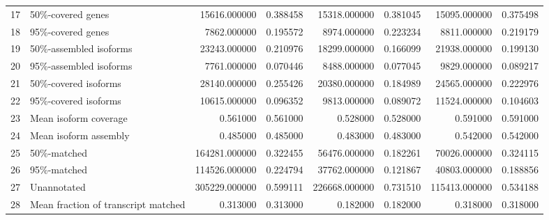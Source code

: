 \begin{tabular}{llrrrrrr}
17 & 50\%-covered genes & 15616.000000 & 0.388458 & 15318.000000 & 0.381045 & 15095.000000 & 0.375498 \\
18 & 95\%-covered genes & 7862.000000 & 0.195572 & 8974.000000 & 0.223234 & 8811.000000 & 0.219179 \\
19 & 50\%-assembled isoforms & 23243.000000 & 0.210976 & 18299.000000 & 0.166099 & 21938.000000 & 0.199130 \\
20 & 95\%-assembled isoforms & 7761.000000 & 0.070446 & 8488.000000 & 0.077045 & 9829.000000 & 0.089217 \\
21 & 50\%-covered isoforms & 28140.000000 & 0.255426 & 20380.000000 & 0.184989 & 24565.000000 & 0.222976 \\
22 & 95\%-covered isoforms & 10615.000000 & 0.096352 & 9813.000000 & 0.089072 & 11524.000000 & 0.104603 \\
23 & Mean isoform coverage & 0.561000 & 0.561000 & 0.528000 & 0.528000 & 0.591000 & 0.591000 \\
24 & Mean isoform assembly & 0.485000 & 0.485000 & 0.483000 & 0.483000 & 0.542000 & 0.542000 \\
25 & 50\%-matched & 164281.000000 & 0.322455 & 56476.000000 & 0.182261 & 70026.000000 & 0.324115 \\
26 & 95\%-matched & 114526.000000 & 0.224794 & 37762.000000 & 0.121867 & 40803.000000 & 0.188856 \\
27 & Unannotated & 305229.000000 & 0.599111 & 226668.000000 & 0.731510 & 115413.000000 & 0.534188 \\
28 & Mean fraction of transcript matched & 0.313000 & 0.313000 & 0.182000 & 0.182000 & 0.318000 & 0.318000 \\
\end{tabular}
